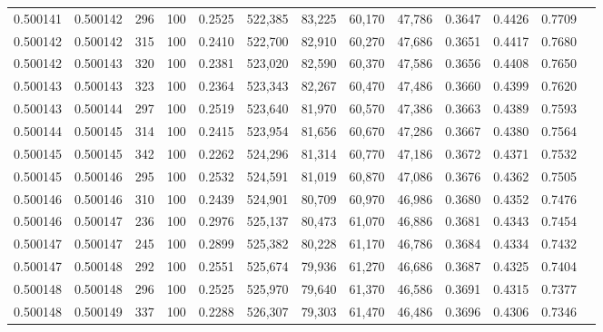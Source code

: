 \begin{tabular}{rrrrrrrrrrrrr}
0.500141 & 0.500142 &   296 & 100 &                                     0.2525 & 522,385 &  83,225 &  60,170 &  47,786 & 0.3647 & 0.4426 & 0.7709 \\
0.500142 & 0.500142 &   315 & 100 &                                     0.2410 & 522,700 &  82,910 &  60,270 &  47,686 & 0.3651 & 0.4417 & 0.7680 \\
0.500142 & 0.500143 &   320 & 100 &                                     0.2381 & 523,020 &  82,590 &  60,370 &  47,586 & 0.3656 & 0.4408 & 0.7650 \\
0.500143 & 0.500143 &   323 & 100 &                                     0.2364 & 523,343 &  82,267 &  60,470 &  47,486 & 0.3660 & 0.4399 & 0.7620 \\
0.500143 & 0.500144 &   297 & 100 &                                     0.2519 & 523,640 &  81,970 &  60,570 &  47,386 & 0.3663 & 0.4389 & 0.7593 \\
0.500144 & 0.500145 &   314 & 100 &                                     0.2415 & 523,954 &  81,656 &  60,670 &  47,286 & 0.3667 & 0.4380 & 0.7564 \\
0.500145 & 0.500145 &   342 & 100 &                                     0.2262 & 524,296 &  81,314 &  60,770 &  47,186 & 0.3672 & 0.4371 & 0.7532 \\
0.500145 & 0.500146 &   295 & 100 &                                     0.2532 & 524,591 &  81,019 &  60,870 &  47,086 & 0.3676 & 0.4362 & 0.7505 \\
0.500146 & 0.500146 &   310 & 100 &                                     0.2439 & 524,901 &  80,709 &  60,970 &  46,986 & 0.3680 & 0.4352 & 0.7476 \\
0.500146 & 0.500147 &   236 & 100 &                                     0.2976 & 525,137 &  80,473 &  61,070 &  46,886 & 0.3681 & 0.4343 & 0.7454 \\
0.500147 & 0.500147 &   245 & 100 &                                     0.2899 & 525,382 &  80,228 &  61,170 &  46,786 & 0.3684 & 0.4334 & 0.7432 \\
0.500147 & 0.500148 &   292 & 100 &                                     0.2551 & 525,674 &  79,936 &  61,270 &  46,686 & 0.3687 & 0.4325 & 0.7404 \\
0.500148 & 0.500148 &   296 & 100 &                                     0.2525 & 525,970 &  79,640 &  61,370 &  46,586 & 0.3691 & 0.4315 & 0.7377 \\
0.500148 & 0.500149 &   337 & 100 &                                     0.2288 & 526,307 &  79,303 &  61,470 &  46,486 & 0.3696 & 0.4306 & 0.7346 \\

\end{tabular}

